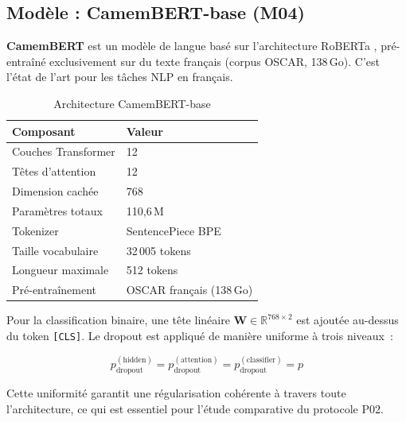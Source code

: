 \documentclass[12pt,a4paper]{article}
\begin{document}
\subsection{Modèle : CamemBERT-base (M04)}
\label{ssec:modele}

\textbf{CamemBERT} \citep{martin-etal-2020-camembert} est un modèle de langue
basé sur l'architecture RoBERTa \citep{liu2019roberta}, pré-entraîné exclusivement
sur du texte français (corpus OSCAR, 138\,Go). C'est l'état de l'art pour les tâches
NLP en français.

\begin{table}[H]
  \centering
  \caption{Architecture CamemBERT-base}
  \label{tab:architecture}
  \begin{tabular}{ll}
    \toprule
    \textbf{Composant}         & \textbf{Valeur} \\
    \midrule
    Couches Transformer        & 12 \\
    Têtes d'attention          & 12 \\
    Dimension cachée           & 768 \\
    Paramètres totaux          & 110,6\,M \\
    Tokenizer                  & SentencePiece BPE \\
    Taille vocabulaire         & 32\,005 tokens \\
    Longueur maximale          & 512 tokens \\
    Pré-entraînement           & OSCAR français (138\,Go) \\
    \bottomrule
  \end{tabular}
\end{table}

Pour la classification binaire, une tête linéaire
$\mathbf{W} \in \mathbb{R}^{768 \times 2}$ est ajoutée au-dessus du token
\texttt{[CLS]}. Le dropout est appliqué de manière uniforme à trois niveaux~:

\begin{equation}
  \label{eq:dropout}
  p_{\text{dropout}}^{(\text{hidden})} = p_{\text{dropout}}^{(\text{attention})}
  = p_{\text{dropout}}^{(\text{classifier})} = p
\end{equation}

Cette uniformité garantit une régularisation cohérente à travers toute l'architecture,
ce qui est essentiel pour l'étude comparative du protocole P02.

\end{document}
